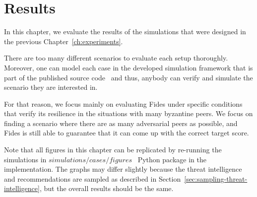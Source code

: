 \chapter{Results}
\label{ch:results}

In this chapter, we evaluate the results of the simulations that were designed in the previous Chapter~\ref{ch:experiments}.

There are too many different scenarios to evaluate each setup thoroughly. Moreover, one can model each case in the developed simulation framework that is part of the published source code~\cite{fidesGithub} and thus, anybody can verify and simulate the scenario they are interested in.

For that reason, we focus mainly on evaluating Fides under specific conditions that verify its resilience in the situations with many byzantine peers.
We focus on finding a scenario where there are as many adversarial peers as possible, and Fides is still able to guarantee that it can come up with the correct target score.

Note that all figures in this chapter can be replicated by re-running the simulations in $simulations/cases/figures$~\cite{fidesGithub} Python package in the implementation.
The graphs may differ slightly because the threat intelligence and recommendations are sampled as described in Section~\ref{sec:sampling-threat-intelligence}, but the overall results should be the same.






